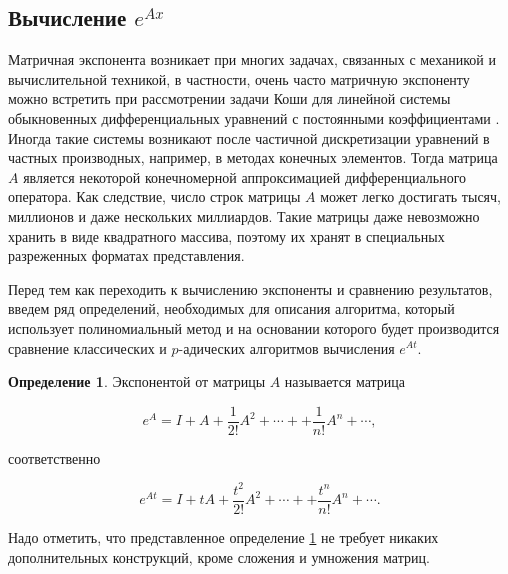 \documentclass[master, och, diploma, times]{sty/SCWorks}
\theoremstyle{plain}
\theoremstyle{definition}
\newtheorem{defn}{Определение}[section]
\numberwithin{equation}{section}
\begin{document}
\subsection{Вычисление $e^{Ax}$}

Матричная экспонента возникает при многих задачах, связанных с механикой и вычислительной техникой, в частности, очень часто матричную экспоненту можно встретить при рассмотрении задачи Коши для линейной системы обыкновенных дифференциальных уравнений с постоянными коэффициентами \cite{bib:ode:2}. Иногда такие системы возникают после частичной дискретизации уравнений в частных производных, например, в методах конечных элементов. Тогда матрица $A$ является некоторой конечномерной аппроксимацией дифференциального оператора. Как следствие, число строк матрицы $A$ может легко достигать тысяч, миллионов и даже нескольких миллиардов\cite{bib:ode:3}. Такие матрицы даже невозможно хранить в виде квадратного массива, поэтому их хранят в специальных разреженных форматах представления.

Перед тем как переходить к вычислению экспоненты и сравнению результатов, введем ряд определений, необходимых для описания алгоритма, который использует полиномиальный метод и на основании которого будет производится сравнение классических и $p$-адических алгоритмов вычисления $e^{At}$.

\begin{defn}\label{def:exp}
Экспонентой от матрицы $A$ называется матрица

\begin{equation}
e^A=I+A+\frac{1}{2!}A^2+\cdots++\frac{1}{n!}A^n + \cdots,
\end{equation}

\noindent соответственно

\begin{equation}
e^{At}=I+tA+\frac{t^2}{2!}A^2+\cdots++\frac{t^n}{n!}A^n + \cdots.
\end{equation}
\end{defn}

Надо отметить, что представленное определение \ref{def:exp} не требует никаких дополнительных конструкций, кроме сложения и умножения матриц.
\end{document}
